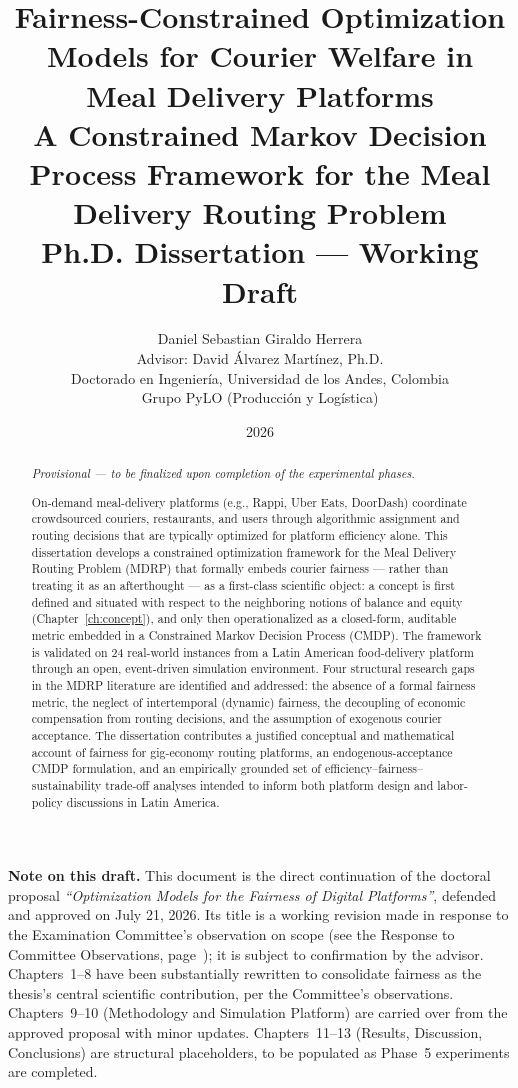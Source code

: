 \documentclass[12pt,a4paper]{report}
\title{\textbf{Fairness-Constrained Optimization Models for Courier Welfare in Meal Delivery Platforms}\\[6pt]
\large A Constrained Markov Decision Process Framework for the Meal Delivery Routing Problem\\[10pt]
\normalsize Ph.D. Dissertation --- Working Draft}
\author{Daniel Sebastian Giraldo Herrera\\[4pt]
\small Advisor: David \'{A}lvarez Mart\'{i}nez, Ph.D.\\
\small Doctorado en Ingenier\'{i}a, Universidad de los Andes, Colombia\\
\small Grupo PyLO (Producci\'{o}n y Log\'{i}stica)}
\date{2026}
\begin{document}
\maketitle

\begingroup
\small
\noindent\textbf{Note on this draft.} This document is the direct continuation of the doctoral proposal \emph{``Optimization Models for the Fairness of Digital Platforms''}, defended and approved on July 21, 2026. Its title is a working revision made in response to the Examination Committee's observation on scope (see the Response to Committee Observations, page~\pageref{ch:response}); it is subject to confirmation by the advisor. Chapters~1--8 have been substantially rewritten to consolidate fairness as the thesis's central scientific contribution, per the Committee's observations. Chapters~9--10 (Methodology and Simulation Platform) are carried over from the approved proposal with minor updates. Chapters~11--13 (Results, Discussion, Conclusions) are structural placeholders, to be populated as Phase~5 experiments are completed.
\endgroup

\newpage
\begin{abstract}
\noindent
\emph{Provisional --- to be finalized upon completion of the experimental phases.}

On-demand meal-delivery platforms (e.g., Rappi, Uber Eats, DoorDash) coordinate crowdsourced couriers, restaurants, and users through algorithmic assignment and routing decisions that are typically optimized for platform efficiency alone. This dissertation develops a constrained optimization framework for the Meal Delivery Routing Problem (MDRP) that formally embeds courier fairness --- rather than treating it as an afterthought --- as a first-class scientific object: a concept is first defined and situated with respect to the neighboring notions of balance and equity (Chapter~\ref{ch:concept}), and only then operationalized as a closed-form, auditable metric embedded in a Constrained Markov Decision Process (CMDP). The framework is validated on 24 real-world instances from a Latin American food-delivery platform through an open, event-driven simulation environment. Four structural research gaps in the MDRP literature are identified and addressed: the absence of a formal fairness metric, the neglect of intertemporal (dynamic) fairness, the decoupling of economic compensation from routing decisions, and the assumption of exogenous courier acceptance. The dissertation contributes a justified conceptual and mathematical account of fairness for gig-economy routing platforms, an endogenous-acceptance CMDP formulation, and an empirically grounded set of efficiency--fairness--sustainability trade-off analyses intended to inform both platform design and labor-policy discussions in Latin America.
\end{abstract}
\end{document}
